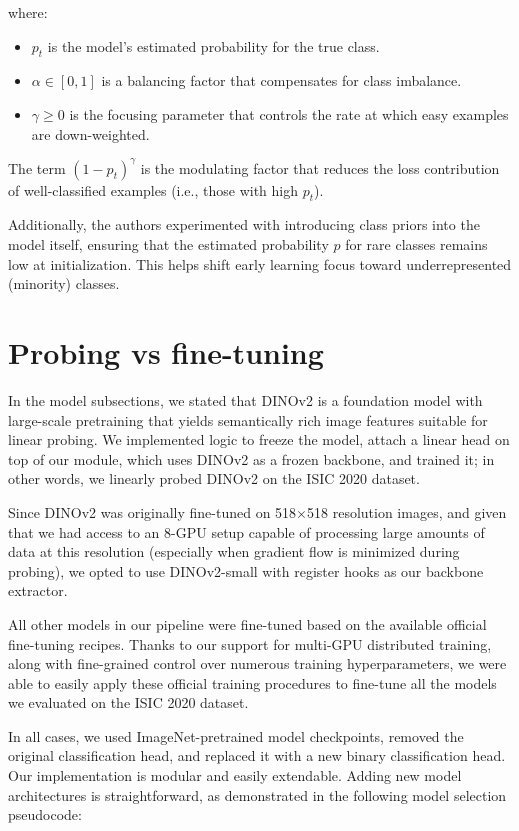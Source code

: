 where:
\begin{itemize}
  \item \( p_t \) is the model’s estimated probability for the true class.
  \item \( \alpha \in [0, 1] \) is a balancing factor that compensates for class imbalance.
  \item \( \gamma \geq 0 \) is the focusing parameter that controls the rate at which easy examples are down-weighted.
\end{itemize}

The term \( (1 - p_t)^{\gamma} \) is the modulating factor that reduces the loss contribution of well-classified examples (i.e., those with high \( p_t \)).

Additionally, the authors experimented with introducing class priors into the model itself, ensuring that the estimated probability \( p \) for rare classes remains low at initialization. This helps shift early learning focus toward underrepresented (minority) classes.


\section{Probing vs fine-tuning}

In the model subsections, we stated that DINOv2 is a foundation model with large-scale pretraining that yields semantically rich image features suitable for linear probing. We implemented logic to freeze the model, attach a linear head on top of our module, which uses DINOv2 as a frozen backbone, and trained it; in other words, we linearly probed DINOv2 on the ISIC 2020 dataset.

Since DINOv2 was originally fine-tuned on 518$\times$518 resolution images, and given that we had access to an 8-GPU setup capable of processing large amounts of data at this resolution (especially when gradient flow is minimized during probing), we opted to use DINOv2-small with register hooks as our backbone extractor.

All other models in our pipeline were fine-tuned based on the available official fine-tuning recipes. Thanks to our support for multi-GPU distributed training, along with fine-grained control over numerous training hyperparameters, we were able to easily apply these official training procedures to fine-tune all the models we evaluated on the ISIC 2020 dataset.

In all cases, we used ImageNet-pretrained model checkpoints, removed the original classification head, and replaced it with a new binary classification head. Our implementation is modular and easily extendable. Adding new model architectures is straightforward, as demonstrated in the following model selection pseudocode:

